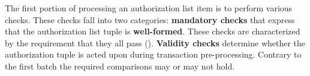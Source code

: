 The first portion of processing an authorization list item is to perform various checks.
These checks fall into two categories:
\textbf{mandatory checks} that express that the
authorization list tuple is \textbf{well-formed}.
These checks are characterized by the requirement that they all pass (\resultMustBeTrueName).
\textbf{Validity checks} determine whether the authorization tuple is acted upon during transaction pre-processing.
Contrary to the first batch the required comparisons may or may not hold.
